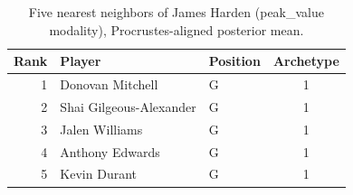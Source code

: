 \begin{table}[htbp]
  \centering\small
  \begin{tabular}{rllc}
    \toprule
    Rank & Player & Position & Archetype \\
    \midrule
    1 & Donovan Mitchell & G & 1 \\
    2 & Shai Gilgeous-Alexander & G & 1 \\
    3 & Jalen Williams & G & 1 \\
    4 & Anthony Edwards & G & 1 \\
    5 & Kevin Durant & G & 1 \\
    \bottomrule
  \end{tabular}
  \caption{Five nearest neighbors of James Harden (peak_value modality), Procrustes-aligned posterior mean.}
  \label{tab:James_Harden_neighbors_peak_value}
\end{table}

